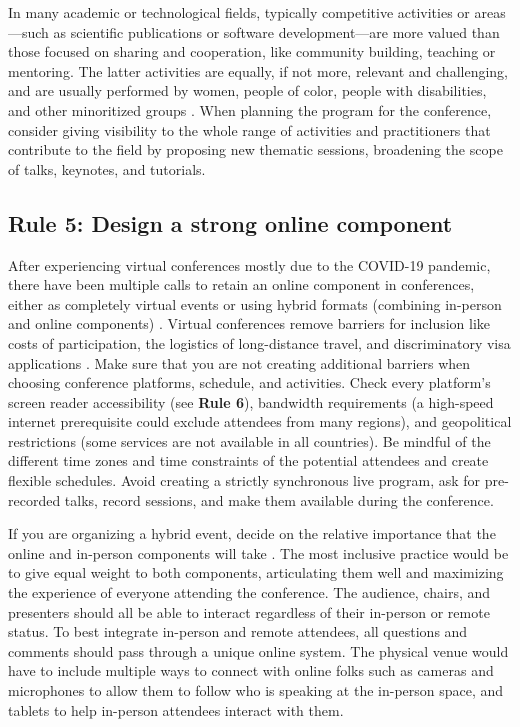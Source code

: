\documentclass[10pt,letterpaper]{article}
\begin{document}
In many academic or technological fields, typically competitive activities or areas—such as scientific publications or software development—are more valued than those focused on sharing and cooperation, like community building, teaching or mentoring. 
The latter activities are equally, if not more, relevant and challenging, and are usually performed by women, people of color, people with disabilities, and other minoritized groups \cite{cheng2020x+, burfordHomelinessMeantHaving2020, light_gender_2022}.
When planning the program for the conference, consider giving visibility to the whole range of activities and practitioners that contribute to the field by proposing new thematic sessions, broadening the scope of talks, keynotes, and tutorials. 


\subsection*{Rule 5: Design a strong online component} 
\label{rule_online}

After experiencing virtual conferences mostly due to the COVID-19 pandemic, there have been multiple calls to retain an online component in conferences, either as completely virtual events or using hybrid formats (combining in-person and online components) \cite{jooKeepOnlineOption2021, woolstonLearningLoveVirtual2020, ninerBetterWhomLeveling2021, roosOnlineConferencesNew2020, levitisCenteringInclusivityDesign2021, sarabipourChangingScientificMeetings2021}.
Virtual conferences remove barriers for inclusion like costs of participation, the logistics of long-distance travel, and discriminatory visa applications \cite{jooKeepOnlineOption2021, ninerBetterWhomLeveling2021, salibaGettingGripsOnline2020, gichoraTenSimpleRules2010a}. 
Make sure that you are not creating additional barriers when choosing conference platforms, schedule, and activities. 
Check every platform's screen reader accessibility (see \textbf{Rule 6}), bandwidth requirements (a high-speed internet prerequisite could exclude attendees from many regions), and geopolitical restrictions (some services are not available in all countries).
Be mindful of the different time zones and time constraints of the potential attendees and create flexible schedules.
Avoid creating a strictly synchronous live program, ask for pre-recorded talks, record sessions, and make them available during the conference.

If you are organizing a hybrid event, decide on the relative importance that the online and in-person components will take \cite{bajpai_towards_2021}. The most inclusive practice would be to give equal weight to both components, articulating them well and maximizing the experience of everyone attending the conference.
The audience, chairs, and presenters should all be able to interact regardless of their in-person or remote status. 
To best integrate in-person and remote attendees, all questions and comments should pass through a unique online system. 
The physical venue would have to include multiple ways to connect with online folks such as cameras and microphones to allow them to follow who is speaking at the in-person space, and tablets to help in-person attendees interact with them.
\end{document}
